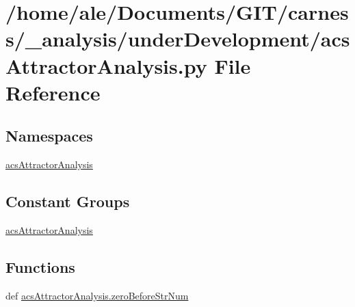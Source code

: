 \hypertarget{a00033}{\section{/home/ale/\-Documents/\-G\-I\-T/carness/\-\_\-analysis/under\-Development/acs\-Attractor\-Analysis.py File Reference}
\label{a00033}
}
\subsection*{Namespaces}
\begin{DoxyCompactItemize}
\item 
\hyperlink{a00090}{acs\-Attractor\-Analysis}
\end{DoxyCompactItemize}
\subsection*{Constant Groups}
\begin{DoxyCompactItemize}
\item 
\hyperlink{a00090}{acs\-Attractor\-Analysis}
\end{DoxyCompactItemize}
\subsection*{Functions}
\begin{DoxyCompactItemize}
\item 
def \hyperlink{a00090_a97aba03091fd66dde4375e3dbffdbede}{acs\-Attractor\-Analysis.\-zero\-Before\-Str\-Num}
\end{DoxyCompactItemize}
